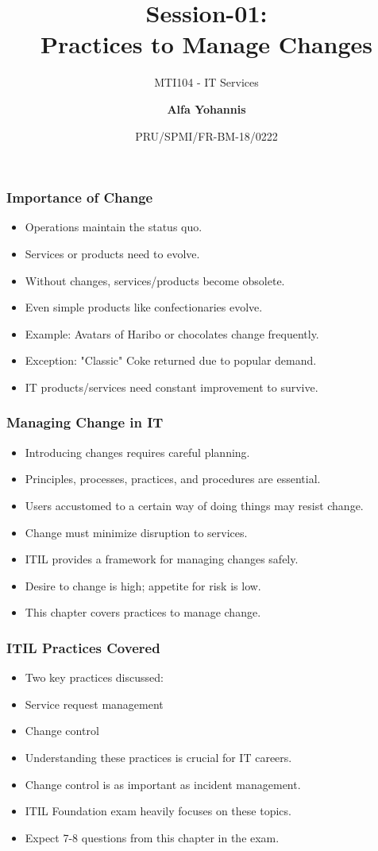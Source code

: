 \documentclass[aspectratio=169, table]{beamer}
\subtitle{MTI104 - IT Services}
\title{Session-01:\\\LARGE{Practices to Manage Changes\\}}
\date[Serial]{\scriptsize {PRU/SPMI/FR-BM-18/0222}}
\author[Pradita]{\small{\textbf{Alfa Yohannis}}}
\begin{document}
\frame{\titlepage}

\begin{frame}
	\frametitle{Importance of Change}
	\begin{itemize}
		\item Operations maintain the status quo.
		\item Services or products need to evolve.
		\item Without changes, services/products become obsolete.
		\item Even simple products like confectionaries evolve.
		\item Example: Avatars of Haribo or chocolates change frequently.
		\item Exception: "Classic" Coke returned due to popular demand.
		\item IT products/services need constant improvement to survive.
	\end{itemize}
\end{frame}

\begin{frame}
	\frametitle{Managing Change in IT}
	\begin{itemize}
		\item Introducing changes requires careful planning.
		\item Principles, processes, practices, and procedures are essential.
		\item Users accustomed to a certain way of doing things may resist change.
		\item Change must minimize disruption to services.
		\item ITIL provides a framework for managing changes safely.
		\item Desire to change is high; appetite for risk is low.
		\item This chapter covers practices to manage change.
	\end{itemize}
\end{frame}

\begin{frame}
	\frametitle{ITIL Practices Covered}
	\begin{itemize}
		\item Two key practices discussed:
		\item Service request management
		\item Change control
		\item Understanding these practices is crucial for IT careers.
		\item Change control is as important as incident management.
		\item ITIL Foundation exam heavily focuses on these topics.
		\item Expect 7-8 questions from this chapter in the exam.
	\end{itemize}
\end{frame}
\end{document}
